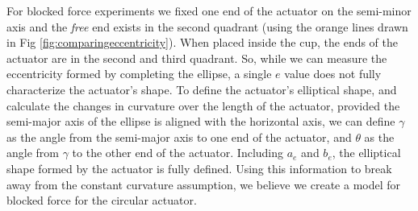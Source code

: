For blocked force experiments we fixed one end of the actuator on the semi-minor axis and the \emph{free} end exists in the second quadrant (using the orange lines drawn in Fig \ref{fig:comparingeccentricity}). When placed inside the cup, the ends of the actuator are in the second and third quadrant. So, while we can measure the eccentricity formed by completing the ellipse, a single $e$ value does not fully characterize the actuator's shape. To define the actuator's elliptical shape, and calculate the changes in curvature over the length of the actuator, provided the semi-major axis of the ellipse is aligned with the horizontal axis, we can define $\gamma$ as the angle from the semi-major axis to one end of the actuator, and $\theta$ as the angle from $\gamma$ to the other end of the actuator. Including $a_e$ and $b_e$, the elliptical shape formed by the actuator is fully defined. Using this information to break away from the constant curvature assumption, we believe we create a model for blocked force for the circular actuator. 
